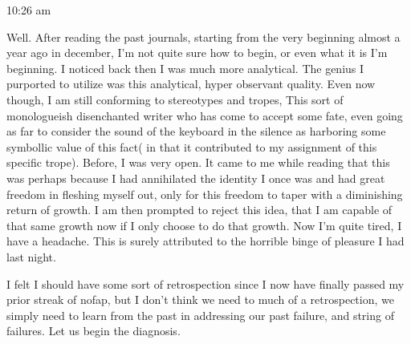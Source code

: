 10:26 am

Well. After reading the past journals, starting from the very beginning
almost a year ago in december, I'm not quite sure how to begin, or even
what it is I'm beginning. I noticed back then I was much more
analytical. The genius I purported to utilize was this analytical, hyper
observant quality. Even now though, I am still conforming to stereotypes
and tropes, This sort of monologueish disenchanted writer who has come
to accept some fate, even going as far to consider the sound of the
keyboard in the silence as harboring some symbollic value of this fact(
in that it contributed to my assignment of this specific trope). Before,
I was very open. It came to me while reading that this was perhaps
because I had annihilated the identity I once was and had great freedom
in fleshing myself out, only for this freedom to taper with a
diminishing return of growth. I am then prompted to reject this idea,
that I am capable of that same growth now if I only choose to do that
growth. Now I'm quite tired, I have a headache. This is surely
attributed to the horrible binge of pleasure I had last night.

\qquad I felt I should have some sort of retrospection since I now have
finally passed my prior streak of nofap, but I don't think we need to
much of a retrospection, we simply need to learn from the past in
addressing our past failure, and string of failures. Let us begin the
diagnosis.


